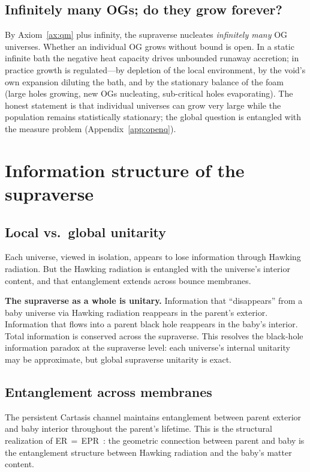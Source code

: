 \subsection{Infinitely many OGs; do they grow forever?}

By Axiom~\ref{ax:qm} plus infinity, the supraverse nucleates \emph{infinitely
many} OG universes. Whether an individual OG grows without bound is open. In a
static infinite bath the negative heat capacity drives unbounded runaway
accretion; in practice growth is regulated---by depletion of the local
environment, by the void's own expansion diluting the bath, and by the stationary
balance of the foam (large holes growing, new OGs nucleating, sub-critical holes
evaporating). The honest statement is that individual universes can grow very
large while the population remains statistically stationary; the global question
is entangled with the measure problem (Appendix~\ref{app:openq}).

\section{Information structure of the supraverse}

\subsection{Local vs.\ global unitarity}

Each universe, viewed in isolation, appears to lose information through Hawking
radiation. But the Hawking radiation is entangled with the universe's interior
content, and that entanglement extends across bounce membranes.

\textbf{The supraverse as a whole is unitary.} Information that ``disappears''
from a baby universe via Hawking radiation reappears in the parent's exterior.
Information that flows into a parent black hole reappears in the baby's interior.
Total information is conserved across the supraverse. This resolves the
black-hole information paradox at the supraverse level: each universe's internal
unitarity may be approximate, but global supraverse unitarity is exact.

\subsection{Entanglement across membranes}

The persistent Cartasis channel maintains entanglement between parent exterior
and baby interior throughout the parent's lifetime. This is the structural
realization of ER\,$=$\,EPR~\citep{maldacena2013}: the geometric connection
between parent and baby is the entanglement structure between Hawking radiation
and the baby's matter content.

